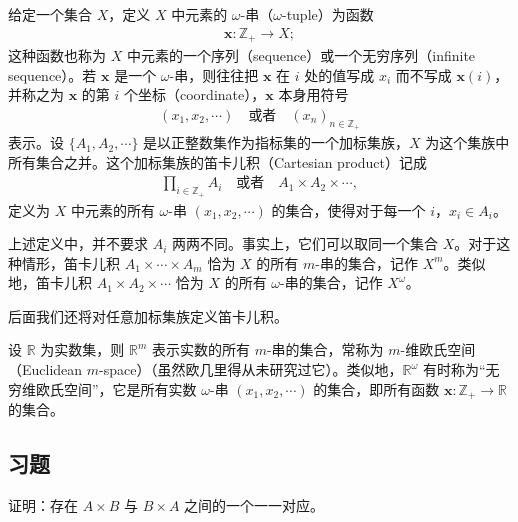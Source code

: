 \documentclass[../../main.tex]{subfiles}
\begin{document}
\begin{definition}[$\omega$-串]\label{definition:ch01-omega串}
给定一个集合 $X$，定义 $X$ 中元素的 $\omega$-串（$\omega$-tuple）为函数
\begin{align*}
\boldsymbol{x}: \mathbb{Z}_{+} \longrightarrow X;
\end{align*}
这种函数也称为 $X$ 中元素的一个序列（sequence）或一个无穷序列（infinite sequence）。若 $\boldsymbol{x}$ 是一个 $\omega$-串，则往往把 $\boldsymbol{x}$ 在 $i$ 处的值写成 $x_{i}$ 而不写成 $\boldsymbol{x}(i)$，并称之为 $\boldsymbol{x}$ 的第 $i$ 个坐标（coordinate），$\boldsymbol{x}$ 本身用符号
\begin{align*}
(x_{1}, x_{2}, \cdots) \quad \text{或者} \quad (x_{n})_{n \in \mathbb{Z}_{+}}
\end{align*}
表示。设 $\{A_{1}, A_{2}, \cdots\}$ 是以正整数集作为指标集的一个加标集族，$X$ 为这个集族中所有集合之并。这个加标集族的笛卡儿积（Cartesian product）记成
\begin{align}
\prod_{i \in \mathbb{Z}_{+}} A_{i} \quad \text{或者} \quad A_{1} \times A_{2} \times \cdots,\label{align:ch01-无穷笛卡儿积}
\end{align}
定义为 $X$ 中元素的所有 $\omega$-串 $(x_{1}, x_{2}, \cdots)$ 的集合，使得对于每一个 $i$，$x_{i} \in A_{i}$。
\end{definition}

上述定义中，并不要求 $A_{i}$ 两两不同。事实上，它们可以取同一个集合 $X$。对于这种情形，笛卡儿积 $A_{1} \times \cdots \times A_{m}$ 恰为 $X$ 的所有 $m$-串的集合，记作 $X^{m}$。类似地，笛卡儿积 $A_{1} \times A_{2} \times \cdots$ 恰为 $X$ 的所有 $\omega$-串的集合，记作 $X^{\omega}$。

后面我们还将对任意加标集族定义笛卡儿积。

\begin{example}\label{example:ch01-欧氏空间}
设 $\mathbb{R}$ 为实数集，则 $\mathbb{R}^{m}$ 表示实数的所有 $m$-串的集合，常称为 $m$-维欧氏空间（Euclidean $m$-space）（虽然欧几里得从未研究过它）。类似地，$\mathbb{R}^{\omega}$ 有时称为“无穷维欧氏空间”，它是所有实数 $\omega$-串 $(x_{1}, x_{2}, \cdots)$ 的集合，即所有函数 $\boldsymbol{x}: \mathbb{Z}_{+} \longrightarrow \mathbb{R}$ 的集合。
\end{example}

\subsection*{习题}

\begin{exercise}\label{exercise:ch01-笛卡儿积-1}
证明：存在 $A \times B$ 与 $B \times A$ 之间的一个一一对应。
\end{exercise}
\end{document}
